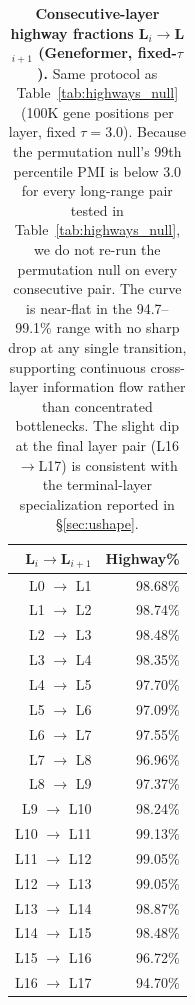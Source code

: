 \documentclass[onecolumn]{article}
\begin{document}
\begin{table}[H]
\centering
\caption{\textbf{Consecutive-layer highway fractions L$_i$$\to$L$_{i+1}$ (Geneformer, fixed-$\tau$).} Same protocol as Table~\ref{tab:highways_null} (100K gene positions per layer, fixed $\tau{=}3.0$). Because the permutation null's 99th percentile PMI is below 3.0 for every long-range pair tested in Table~\ref{tab:highways_null}, we do not re-run the permutation null on every consecutive pair. The curve is near-flat in the 94.7--99.1\% range with no sharp drop at any single transition, supporting continuous cross-layer information flow rather than concentrated bottlenecks. The slight dip at the final layer pair (L16$\to$L17) is consistent with the terminal-layer specialization reported in \S\ref{sec:ushape}.}
\label{tab:highways_consecutive}
\smallskip
\small
\begin{tabular}{rr}
\toprule
L$_i$$\to$L$_{i+1}$ & Highway\% \\
\midrule
L0  $\to$ L1  & 98.68\% \\
L1  $\to$ L2  & 98.74\% \\
L2  $\to$ L3  & 98.48\% \\
L3  $\to$ L4  & 98.35\% \\
L4  $\to$ L5  & 97.70\% \\
L5  $\to$ L6  & 97.09\% \\
L6  $\to$ L7  & 97.55\% \\
L7  $\to$ L8  & 96.96\% \\
L8  $\to$ L9  & 97.37\% \\
L9  $\to$ L10 & 98.24\% \\
L10 $\to$ L11 & 99.13\% \\
L11 $\to$ L12 & 99.05\% \\
L12 $\to$ L13 & 99.05\% \\
L13 $\to$ L14 & 98.87\% \\
L14 $\to$ L15 & 98.48\% \\
L15 $\to$ L16 & 96.72\% \\
L16 $\to$ L17 & 94.70\% \\
\bottomrule
\end{tabular}
\end{table}
\end{document}
